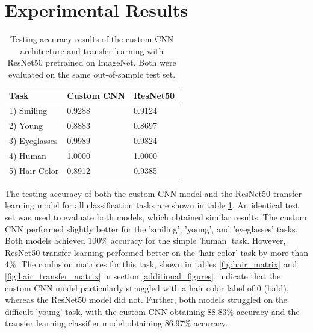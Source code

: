 \documentclass[10pt,twocolumn,letterpaper]{article}
\begin{document}
\section{Experimental Results} \label{results}
\begin{table}[!htbp]
    \caption{Testing accuracy results of the custom CNN architecture and transfer learning with ResNet50 pretrained on ImageNet. Both were evaluated on the same out-of-sample test set.}
    \begin{tabularx}{\columnwidth}{X|X|X}
        \hline
        Task          & Custom CNN & ResNet50\\
        \hline
        1) Smiling    & 0.9288     & 0.9124\\
        2) Young      & 0.8883     & 0.8697   \\
        3) Eyeglasses & 0.9989     & 0.9824\\   
        4) Human      & 1.0000     & 1.0000\\
        \hline
        5) Hair Color & 0.8912     & 0.9385 \\
    \end{tabularx}
    \label{table: simulation parameters}
\end{table}

The testing accuracy of both the custom CNN model and the ResNet50 transfer learning model for all classification tasks are shown in table \ref{table: simulation parameters}. An identical test set was used to evaluate both models, which obtained similar results. The custom CNN performed slightly better for the 'smiling', 'young', and 'eyeglasses' tasks. Both models achieved 100\% accuracy for the simple 'human' task. However, ResNet50 transfer learning performed better on the 'hair color' task by more than 4\%. The confusion matrices for this task, shown in tables \ref{fig:hair_matrix} and \ref{fig:hair_transfer_matrix} in section \ref{additional_figures}, indicate that the custom CNN model particularly struggled with a hair color label of 0 (bald), whereas the ResNet50 model did not. Further, both models struggled on the difficult 'young' task, with the custom CNN obtaining 88.83\% accuracy and the transfer learning classifier model obtaining 86.97\% accuracy. 
\end{document}
